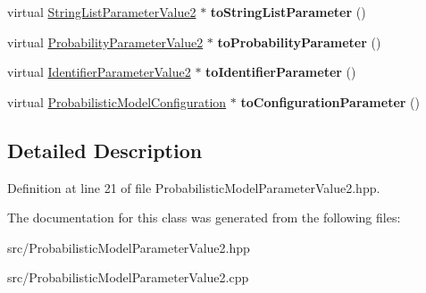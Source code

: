 \begin{DoxyCompactItemize}
\item 
\mbox{\label{classtops_1_1ProbabilisticModelParameterValue2_a7ea67a1d7129b30dd7c409d4c36ae7df}} 
virtual \hyperlink{classtops_1_1StringListParameterValue2}{String\+List\+Parameter\+Value2} $\ast$ {\bfseries to\+String\+List\+Parameter} ()
\item 
\mbox{\label{classtops_1_1ProbabilisticModelParameterValue2_ac0c32ccda69e6c9da4b6f7b3f1eb0712}} 
virtual \hyperlink{classtops_1_1ProbabilityParameterValue2}{Probability\+Parameter\+Value2} $\ast$ {\bfseries to\+Probability\+Parameter} ()
\item 
\mbox{\label{classtops_1_1ProbabilisticModelParameterValue2_a82c46cbebb390be11b675ba3355c3fdc}} 
virtual \hyperlink{classtops_1_1IdentifierParameterValue2}{Identifier\+Parameter\+Value2} $\ast$ {\bfseries to\+Identifier\+Parameter} ()
\item 
\mbox{\label{classtops_1_1ProbabilisticModelParameterValue2_ab990c23a18d3f51d8ebd3f1374a72e6a}} 
virtual \hyperlink{classtops_1_1ProbabilisticModelConfiguration}{Probabilistic\+Model\+Configuration} $\ast$ {\bfseries to\+Configuration\+Parameter} ()
\end{DoxyCompactItemize}


\subsection{Detailed Description}


Definition at line 21 of file Probabilistic\+Model\+Parameter\+Value2.\+hpp.



The documentation for this class was generated from the following files\+:\begin{DoxyCompactItemize}
\item 
src/Probabilistic\+Model\+Parameter\+Value2.\+hpp\item 
src/Probabilistic\+Model\+Parameter\+Value2.\+cpp\end{DoxyCompactItemize}
